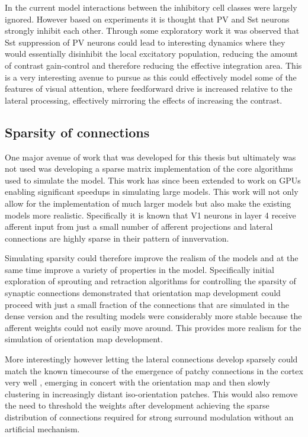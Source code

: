 In the current model interactions between the inhibitory cell classes
were largely ignored. However based on experiments it is thought that
PV and Sst neurons strongly inhibit each other. Through some
exploratory work it was observed that Sst suppression of PV neurons
could lead to interesting dynamics where they would essentially
disinhibit the local excitatory population, reducing the amount of
contrast gain-control and therefore reducing the effective integration
area. This is a very interesting avenue to pursue as this could
effectively model some of the features of visual attention, where
feedforward drive is increased relative to the lateral processing,
effectively mirroring the effects of increasing the contrast.

\subsection{Sparsity of connections}

One major avenue of work that was developed for this thesis but
ultimately was not used was developing a sparse matrix implementation
of the core algorithms used to simulate the model. This work has since
been extended to work on GPUs enabling significant speedups in
simulating large models. This work will not only allow for the
implementation of much larger models but also make the existing models
more realistic. Specifically it is known that V1 neurons in layer 4
receive afferent input from just a small number of afferent
projections and lateral connections are highly sparse in their pattern
of innvervation.

Simulating sparsity could therefore improve the realism of the models
and at the same time improve a variety of properties in the
model. Specifically initial exploration of sprouting and retraction
algorithms for controlling the sparsity of synaptic connections
demonstrated that orientation map development could proceed with just
a small fraction of the connections that are simulated in the dense
version and the resulting models were considerably more stable because
the afferent weights could not easily move around. This provides more
realism for the simulation of orientation map development.

More interestingly however letting the lateral connections develop
sparsely could match the known timecourse of the emergence of patchy
connections in the cortex very well \citep{Ruthazer1996}, emerging in
concert with the orientation map and then slowly clustering in
increasingly distant iso-orientation patches. This would also remove
the need to threshold the weights after development achieving the
sparse distribution of connections required for strong surround
modulation without an artificial mechanism.

